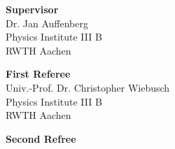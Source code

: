 \cleardoublepage

\vspace*{17cm}

\begin{flushleft}
	\textbf{Supervisor}\\
	Dr. Jan Auffenberg\\
	Physics Institute III B\\
	RWTH Aachen\\
	\bigskip
	
	\textbf{First Referee}\\
	Univ.-Prof. Dr. Christopher Wiebusch\\
	Physics Institute III B\\
	RWTH Aachen\\
	\bigskip
	
	\textbf{Second Refree}\\
	
\end{flushleft}